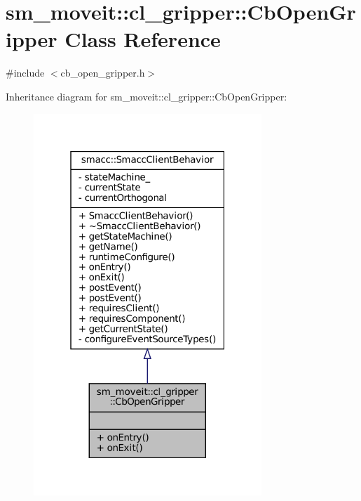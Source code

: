 \hypertarget{classsm__moveit_1_1cl__gripper_1_1CbOpenGripper}{}\section{sm\+\_\+moveit\+:\+:cl\+\_\+gripper\+:\+:Cb\+Open\+Gripper Class Reference}
\label{classsm__moveit_1_1cl__gripper_1_1CbOpenGripper}


{\ttfamily \#include $<$cb\+\_\+open\+\_\+gripper.\+h$>$}



Inheritance diagram for sm\+\_\+moveit\+:\+:cl\+\_\+gripper\+:\+:Cb\+Open\+Gripper\+:
\nopagebreak
\begin{figure}[H]
\begin{center}
\leavevmode
\includegraphics[width=244pt]{classsm__moveit_1_1cl__gripper_1_1CbOpenGripper__inherit__graph}
\end{center}
\end{figure}


